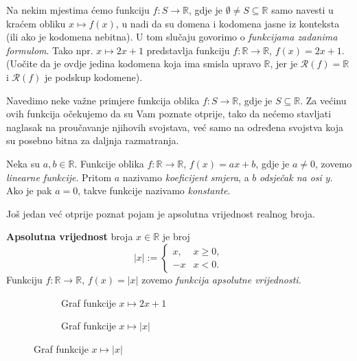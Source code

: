\begin{remark}
Na nekim mjestima ćemo funkciju \(f : S\to \mathbb{R}\), gdje je \(\emptyset\neq S\subseteq \mathbb{R}\) samo navesti u kraćem obliku \(x\mapsto f(x)\), u nadi da su domena i kodomena jasne iz konteksta (ili ako je kodomena nebitna). U tom slučaju govorimo o \textit{funkcijama zadanima formulom}. Tako npr. \(x\mapsto 2x+1\) predstavlja funkciju \(f : \mathbb{R}\to \mathbb{R}\), \(f(x)=2x+1\). (Uočite da je ovdje jedina kodomena koja ima smisla upravo \(\mathbb{R}\), jer je \(\mathcal{R}(f)=\mathbb{R}\) i \(\mathcal{R}(f)\) je podskup kodomene).
\end{remark}
Navedimo neke važne primjere funkcija oblika $f : S\to \mathbb{R}$, gdje je $S\subseteq \mathbb{R}$. Za većinu ovih funkcija očekujemo da su Vam poznate otprije, tako da nećemo stavljati naglasak na proučavanje njihovih svojstava, već samo na određena svojstva koja su posebno bitna za daljnja razmatranja.
\begin{definition}
Neka su $a, b\in \mathbb{R}$. Funkcije oblika $f : \mathbb{R}\to \mathbb{R}$, $f(x)=ax+b$, gdje je $a\neq 0$, zovemo \textit{linearne funkcije}. Pritom $a$ nazivamo \textit{koeficijent smjera}, a $b$ \textit{odsječak na osi $y$}. Ako je pak $a=0$, takve funkcije nazivamo \textit{konstante}.
\end{definition}
Još jedan već otprije poznat pojam je apsolutna vrijednost realnog broja.
\begin{definition}
\textbf{Apsolutna vrijednost} broja $x\in \mathbb{R}$ je broj
$$\left\lvert x\right\rvert:=\begin{cases}
x, & x\geq 0,\\
-x & x<0.
\end{cases}$$
Funkciju $f : \mathbb{R}\to \mathbb{R}$, $f(x)=\left\lvert x\right\rvert$ zovemo \textit{funkcija apsolutne vrijednosti}.
\end{definition}
\begin{figure}[ht]
\begin{subfigure}[t]{.5\textwidth}
\centering
{}
\caption*{Graf funkcije \(x\mapsto 2x+1\)}
\end{subfigure}%
\begin{subfigure}[t]{.5\textwidth}
\centering
{}
\caption*{Graf funkcije \(x\mapsto \left\lvert x\right\rvert\)}
\end{subfigure}
\end{figure}

